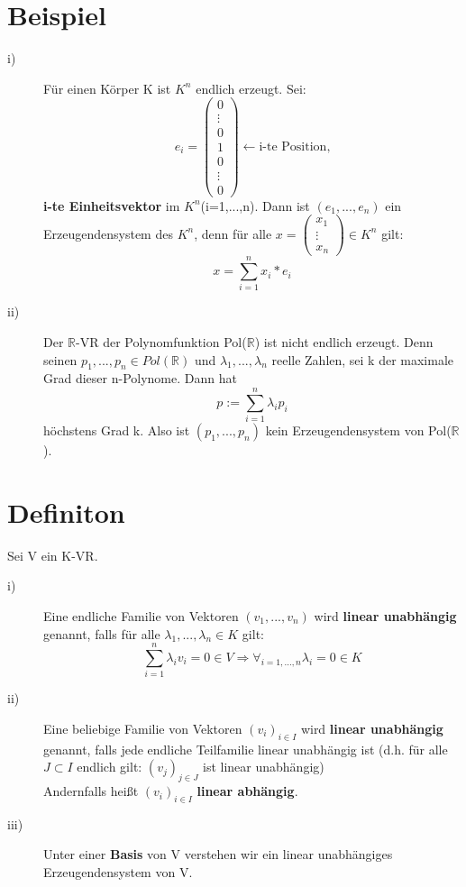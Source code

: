 \documentclass{scrbook}
\begin{document}
\section{Beispiel}
\begin{description}
\item[i)] Für einen Körper K ist \(K^n\) endlich erzeugt. Sei:
\[
e_i=
\left(\begin{array}{c}
0\\
\vdots\\
0\\
1\\
0\\
\vdots\\
0
\end{array}\right) \leftarrow \text{i-te Position,}
\]
\textbf{i-te Einheitsvektor} im \(K^n\)(i=1,...,n). Dann ist \((e_1,...,e_n)\) ein Erzeugendensystem des \(K^n\), denn für alle \(x 
= \left(\begin{array}{c}x_1\\\vdots\\x_n\end{array}\right)\in K^n\) gilt: \[
x=\sum^n_{i=1}x_i*e_i
\]
\item[ii)] Der \(\mathbb{R}\)-VR der Polynomfunktion Pol(\(\mathbb{R}\)) ist nicht endlich erzeugt. Denn seinen \(p_1,...,p_n \in Pol(\mathbb{R})\) und \(\lambda_1,...,\lambda_n\) reelle Zahlen, sei k der maximale Grad dieser n-Polynome. Dann hat \[p:= \sum^n_{i=1}\lambda_i p_i\] höchstens Grad k. Also ist \((p_1,...,p_n)\) kein Erzeugendensystem von Pol(\(\mathbb{R}\)).
\end{description}
\section{Definiton}
Sei V ein K-VR.
\begin{description}
\item[i)] Eine endliche Familie von Vektoren \((v_1,...,v_n)\) wird \textbf{linear unabhängig} genannt, falls für alle \(\lambda_1,...,\lambda_n \in K\) gilt:\[ \sum^n_{i=1} \lambda_i v_i = 0\in V \Rightarrow \forall_{i=1,...,n}\lambda_i=0\in K\]
\item[ii)]Eine beliebige Familie von Vektoren \((v_i)_{i\in I}\) wird \textbf{linear unabhängig} genannt, falls jede endliche Teilfamilie linear unabhängig ist (d.h. für alle \(J \subset I\) endlich gilt: \((v_j)_{j\in J}\) ist linear unabhängig)\\
Andernfalls heißt \((v_i)_{i\in I}\) \textbf{linear abhängig}.
\item[iii)] Unter einer \textbf{Basis} von V verstehen wir ein linear unabhängiges Erzeugendensystem von V.
\end{description}
\end{document}

